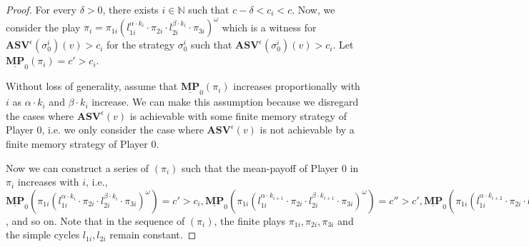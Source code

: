 \begin{proof}
    For every $\delta > 0$, there exists $i \in \mathbb{N}$ such that $c - \delta < c_i < c$. Now, we consider the play $\pi_i = \pi_{1i}(l^{\alpha \cdot k_i}_{1i} \cdot \pi_{2i} \cdot l^{\beta \cdot k_i}_{2i} \cdot \pi_{3i})^{\omega}$ which is a witness for $ \mathbf{ASV}^{\epsilon}(\sigma_0^i)(v) > c_i$ for the strategy $\sigma_0^i$ such that $\mathbf{ASV}^{\epsilon} (\sigma_0^i)(v) > c_i$. Let $\underline{\mathbf{MP}}_0(\pi_i)= c' > c_i$. 

    Without loss of generality, assume that $\underline{\mathbf{MP}}_0(\pi_i)$ increases proportionally with $i$ as $\alpha \cdot k_i$ and $\beta \cdot k_i$ increase. We can make this assumption because we disregard the cases where $\mathbf{ASV}^{\epsilon}(v)$ is achievable with some finite memory strategy of Player 0, i.e. we only consider the case where $\mathbf{ASV}^{\epsilon}(v)$ is not achievable by a finite memory strategy of Player 0.

    Now we can construct a series of $(\pi_i)$ such that the  mean-payoff of Player 0 in $\pi_i$ increases with $i$, i.e., $\underline{\mathbf{MP}}_0(\pi_{1i}(l^{\alpha \cdot k_i}_{1i} \cdot \pi_{2i} \cdot l^{\beta \cdot k_i}_{2i} \cdot \pi_{3i})^{\omega}) = c' > c_i, \underline{\mathbf{MP}}_0(\pi_{1i}(l^{\alpha \cdot k_{i+1}}_{1i} \cdot \pi_{2i} \cdot l^{\beta \cdot k_{i+1}}_{2i} \cdot \pi_{3i})^{\omega}) = c'' > c', \underline{\mathbf{MP}}_0(\pi_{1i}(l^{\alpha \cdot k_{i+2}}_{1i} \cdot \pi_{2i} \cdot l^{\beta \cdot k_{i+2}}_{2i} \cdot \pi_{3i})^{\omega}) = c''' > c''$, and so on. Note that in the sequence of $(\pi_i)$, the finite plays $\pi_{1i}, \pi_{2i}, \pi_{3i}$ and the simple cycles $l_{1i}, l_{2i}$ remain constant.


\end{proof}
